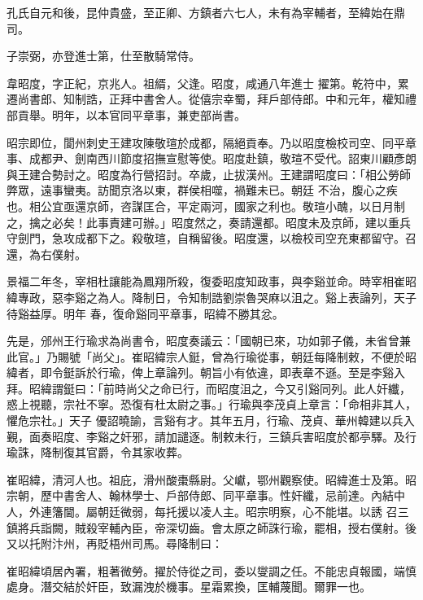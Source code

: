 \begin{pinyinscope}
 孔氏自元和後，昆仲貴盛，至正卿、方鎮者六七人，未有為宰輔者，至緯始在鼎司。



 子崇弼，亦登進士第，仕至散騎常侍。



 韋昭度，字正紀，京兆人。祖縃，父逢。昭度，咸通八年進士
 擢第。乾符中，累遷尚書郎、知制誥，正拜中書舍人。從僖宗幸蜀，拜戶部侍郎。中和元年，權知禮部貢舉。明年，以本官同平章事，兼吏部尚書。



 昭宗即位，閬州刺史王建攻陳敬瑄於成都，隔絕貢奉。乃以昭度檢校司空、同平章事、成都尹、劍南西川節度招撫宣慰等使。昭度赴鎮，敬瑄不受代。詔東川顧彥朗與王建合勢討之。昭度為行營招討。卒歲，止拔漢州。王建謂昭度曰：「相公勞師弊眾，遠事蠻夷。訪聞京洛以東，群侯相噬，禍難未已。朝廷
 不治，腹心之疾也。相公宜亟還京師，咨謀匡合，平定兩河，國家之利也。敬瑄小醜，以日月制之，擒之必矣！此事責建可辦。」昭度然之，奏請還都。昭度未及京師，建以重兵守劍門，急攻成都下之。殺敬瑄，自稱留後。昭度還，以檢校司空充東都留守。召還，為右僕射。



 景福二年冬，宰相杜讓能為鳳翔所殺，復委昭度知政事，與李谿並命。時宰相崔昭緯專政，惡李谿之為人。降制日，令知制誥劉崇魯哭麻以沮之。谿上表論列，天子待谿益厚。明年
 春，復命谿同平章事，昭緯不勝其忿。



 先是，邠州王行瑜求為尚書令，昭度奏議云：「國朝已來，功如郭子儀，未省曾兼此官。」乃賜號「尚父」。崔昭緯宗人鋌，曾為行瑜從事，朝廷每降制敕，不便於昭緯者，即令鋌訴於行瑜，俾上章論列。朝旨小有依違，即表章不遜。至是李谿入拜。昭緯謂鋌曰：「前時尚父之命已行，而昭度沮之，今又引谿同列。此人奸纖，惑上視聽，宗社不寧。恐復有杜太尉之事。」行瑜與李茂貞上章言：「命相非其人，懼危宗社。」天子
 優詔曉諭，言谿有才。其年五月，行瑜、茂貞、華州韓建以兵入覲，面奏昭度、李谿之奸邪，請加譴逐。制敕未行，三鎮兵害昭度於都亭驛。及行瑜誅，降制復其官爵，令其家收葬。



 崔昭緯，清河人也。祖庇，滑州酸棗縣尉。父巘，鄂州觀察使。昭緯進士及第。昭宗朝，歷中書舍人、翰林學士、戶部侍郎、同平章事。性奸纖，忌前達。內結中人，外連籓閫。屬朝廷微弱，每托援以凌人主。昭宗明察，心不能堪。以誘
 召三鎮將兵詣闕，賊殺宰輔內臣，帝深切齒。會太原之師誅行瑜，罷相，授右僕射。後又以托附汴州，再貶梧州司馬。尋降制曰：



 崔昭緯頃居內署，粗著微勞。擢於侍從之司，委以燮調之任。不能忠貞報國，端慎處身。潛交結於奸臣，致漏洩於機事。星霜累換，匡輔蔑聞。爾罪一也。




\end{pinyinscope}
